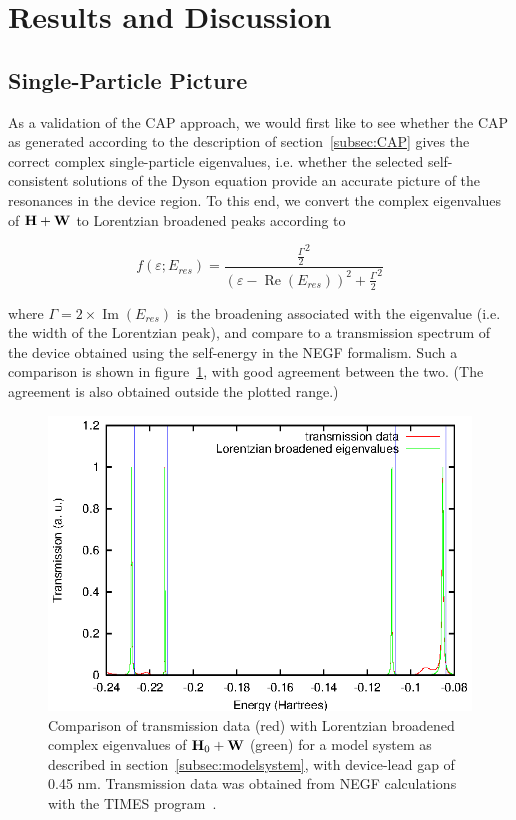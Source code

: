 \section{Results and Discussion}
\label{sec:results}

\subsection{Single-Particle Picture}
\label{subsec:SingleParticle}

As a validation of the \ac{CAP} approach, we would first like to see whether
the \ac{CAP} as generated according to the description of
section~\ref{subsec:CAP} gives the correct complex single-particle eigenvalues,
i.e. whether the selected self-consistent solutions of the Dyson equation
provide an accurate picture of the resonances in the device region. To this
end, we convert the complex eigenvalues of $\mathbf{H} + \mathbf{W}$ to Lorentzian
broadened peaks according to

\begin{equation}
	f(\varepsilon;E_{res})
	= \frac{\frac{\Gamma}{2}^2}
	       {(\varepsilon - \operatorname{Re}(E_{res}))^2
	       + \frac{\Gamma}{2}^2}
	\label{eq:lobro}
\end{equation}

where $\Gamma = 2 \times \operatorname{Im}(E_{res})$ is the broadening
associated with the eigenvalue (i.e. the width of the Lorentzian peak), and
compare to a transmission spectrum of the device obtained using the self-energy
in the \ac{NEGF} formalism. Such a comparison is shown in
figure~\ref{fig:lobro-hwevals}, with good agreement between the two. (The
agreement is also obtained outside the plotted range.)

\begin{figure}
	\begin{center}
		\includegraphics[width=0.9\linewidth]{figures/4evals}
	\end{center}
	\caption{Comparison of transmission data (red) with Lorentzian
	broadened complex eigenvalues of $\mathbf{H}_0 + \mathbf{W}$ (green) for a
	model system as described in section~\ref{subsec:modelsystem}, with
	device-lead gap of 0.45 nm. Transmission data was obtained from
	\ac{NEGF} calculations with the TIMES program~\cite{times}.}
	\label{fig:lobro-hwevals}
\end{figure}

